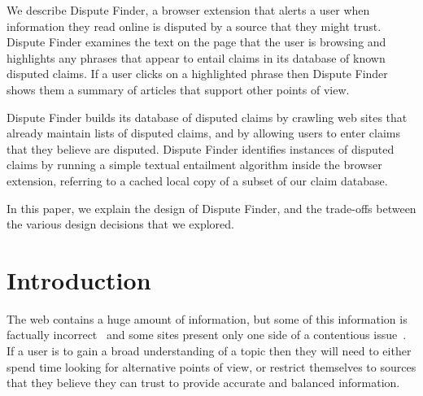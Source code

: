\documentclass{www2010-submission}
\newcommand{\todo}[1]{}
\begin{document}
\abstract

We describe Dispute Finder, a browser extension that alerts a user when information they read online is disputed by a source that they might trust. Dispute Finder examines the text on the page that the user is browsing and highlights any phrases that appear to entail claims in its database of known disputed claims. If a user clicks on a highlighted phrase then Dispute Finder shows them a summary of articles that support other points of view.

Dispute Finder builds its database of disputed claims by crawling web sites that already maintain lists of disputed claims, and by allowing users to enter claims that they believe are disputed. Dispute Finder identifies instances of disputed claims by running a simple textual entailment algorithm inside the browser extension, referring to a cached local copy of a subset of our claim database.

In this paper, we explain the design of Dispute Finder, and the trade-offs between the various design decisions that we explored. 






\section{Introduction}

\todo{update screenshots}
\todo{should this be spun as about news, or information in general}
\todo{need to talk more about what we know about people}
 

The web contains a huge amount of information, but some of this information is factually incorrect~\cite{Neumann2003,Resnik1998,Zhou2004} and some sites present only one side of a contentious issue~\cite{Herman2002}. If a user is to gain a broad understanding of a topic then they will need to either spend time looking for alternative points of view, or restrict themselves to sources that they believe they can trust to provide accurate and balanced information.
\end{document}
